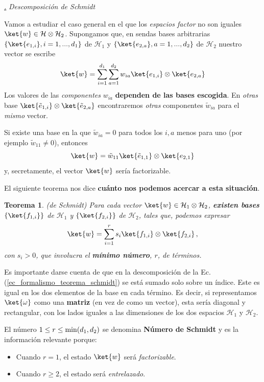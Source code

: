 \documentclass[a4paper,11pt]{book} %
\newtheorem{teorema_contador}{Teorema}
\newcommand{\Teorema}[1]{
		\begin{mybox_gray2}{}
			\begin{teorema_contador}
				 #1 
			\end{teorema_contador} 
		\end{mybox_gray2}
	}
\numberwithin{equation}{chapter}
\def\subsubiContadorIt{\par\addtocounter{subsubsection}{1}\underline{\it\thesubsubsection.}\hskip0.5cm \setcounter{subsubsubsectionIt}{0}}
\newcommand{\SubsubiIt}[1]{
		\subsubiContadorIt \textit{#1}
	}
\newcounter{subsubsubsectionIt}[subsubsection]
\begin{document}
			\SubsubiIt{Descomposición de Schmidt}

Vamos a estudiar el caso general en el que los \textit{espacios factor} no son iguales $\ket{w} \in \mathcal{H} \otimes \mathcal{H}_2$. Supongamos que, en sendas bases arbitrarias $\{\ket{e_{1,i}}, i=1,...,d_1\}$  de $\mathcal{H}_1$ y  $\{\ket{e_{2,a}},a=1,...,d_2\}$  de $\mathcal{H}_2$ nuestro vector se escribe
	\begin{equation}
	\ket{w} = \sum_{i=1}^{d_1}\sum_{a=1}^{d_2} w_{ia} \ket{e_{1,i}}\otimes \ket{e_{2,a}}
	\end{equation}
Los valores de las \textit{componentes} $w_{ia}$ \textbf{dependen de las bases escogida}. En \textit{otras} base $\ket{\tilde e_{1,i}}\otimes\ket{\tilde e_{2,a}}$ encontraremos \textit{otras} componentes $\tilde w_{ia}$ para el \textit{mismo} vector. 

Si existe una base en la que $\tilde w_{ia}=0$ para todos los $i,a$ menos para uno (por ejemplo $\tilde w_{11}\neq 0$), entonces 
	\begin{equation}
	\ket{w}= \tilde w_{11}\ket{\tilde e_{1,1}}\otimes \ket{e_{2,1}}
	\end{equation}
y, secretamente, el vector $\ket{w}$ sería factorizable.

El siguiente teorema nos dice \textbf{cuánto nos podemos acercar a esta situación}.

	\Teorema{ (\textit{de Schmidt)} 
	Para cada vector $\ket{w}\in \mathcal{H}_1\otimes \mathcal{H}_2$, \textbf{existen  bases } $\{\ket{f_{1,i}}\}$  de $\mathcal{H}_1$ y  $\{\ket{f_{2,i}}\}$  de $\mathcal{H}_2$, tales que, podemos expresar 
		\begin{equation} \label{ec_formalismo_teorema_schmidt}
		\ket{w} = \sum_{i=1}^r s_i \ket{f_{1,i}}\otimes\ket{f_{2,i}} \, ,
		\end{equation}
	 con $s_i>0$, que   involucra el \textbf{mínimo número}, $r$, de términos.
	}

Es importante darse cuenta de que en la descomposición de la Ec. (\ref{ec_formalismo_teorema_schmidt}) se está sumado solo sobre un índice. Este es igual en los dos elementos de la base en cada término. Es decir, si representamos $\ket{\omega}$ como una \textbf{matriz} (en vez de como un vector), esta sería diagonal y rectangular, con los lados iguales a las dimensiones de los dos espacios $\mathcal{H}_1$ y $\mathcal{H}_2$.

El número $1\leq r\leq {\rm min}(d_1,d_2)$ se denomina \textbf{Número de Schmidt} y  es la información relevante  porque:
\begin{itemize}
	\item Cuando $r=1$, el estado $\ket{w}$ será \textit{factorizable}.
	\item Cuando $r\geq 2$, el estado será \textit{entrelazado}.
\end{itemize}
\end{document}
